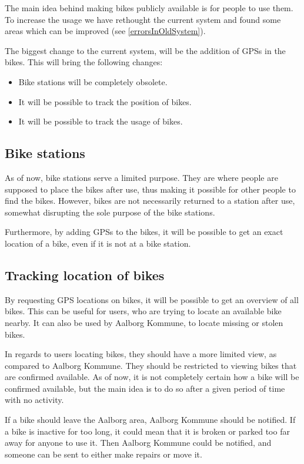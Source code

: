 The main idea behind making bikes publicly available is for people to use them. To increase the usage we have rethought the current system and found some areas which can be improved (see \cref{errorsInOldSystem}).

The biggest change to the current system, will be the addition of GPSs in the bikes.
This will bring the following changes:
\begin{itemize}
\item Bike stations will be completely obsolete.
\item It will be possible to track the position of bikes.
\item It will be possible to track the usage of bikes.
\end{itemize}

\subsection{Bike stations}
As of now, bike stations serve a limited purpose.
They are where people are supposed to place the bikes after use, thus making it possible for other people to find the bikes.
However, bikes are not necessarily returned to a station after use, somewhat disrupting the sole purpose of the bike stations.

Furthermore, by adding GPSs to the bikes, it will be possible to get an exact location of a bike, even if it is not at a bike station.

\subsection{Tracking location of bikes}
By requesting GPS locations on bikes, it will be possible to get an overview of all bikes.
This can be useful for users, who are trying to locate an available bike nearby.
It can also be used by Aalborg Kommune, to locate missing or stolen bikes.

In regards to users locating bikes, they should have a more limited view, as compared to Aalborg Kommune.
They should be restricted to viewing bikes that are confirmed available.
As of now, it is not completely certain how a bike will be confirmed available, but the main idea is to do so after a given period of time with no activity.

If a bike should leave the Aalborg area, Aalborg Kommune should be notified.
If a bike is inactive for too long, it could mean that it is broken or parked too far away for anyone to use it.
Then Aalborg Kommune could be notified, and someone can be sent to either make repairs or move it.

